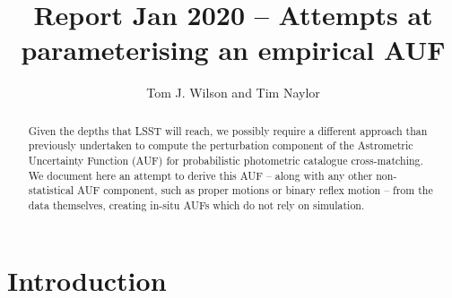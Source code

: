 \documentclass[fleqn,usenatbib]{mnras}
\title[]{Report Jan 2020 – Attempts at parameterising an empirical AUF}
\author[Tom J. Wilson and Tim Naylor]{
Tom J. Wilson
and Tim Naylor
\\
}
\date{}
\begin{document}
\label{firstpage}
\pagerange{\pageref{firstpage}--\pageref{lastpage}}
\maketitle
\begin{abstract}

Given the depths that LSST will reach, we possibly require a different approach than previously undertaken to compute the perturbation component of the Astrometric Uncertainty Function (AUF) for probabilistic photometric catalogue cross-matching. We document here an attempt to derive this AUF -- along with any other non-statistical AUF component, such as proper motions or binary reflex motion -- from the data themselves, creating in-situ AUFs which do not rely on simulation.

\end{abstract}




\section{Introduction}
\end{document}
